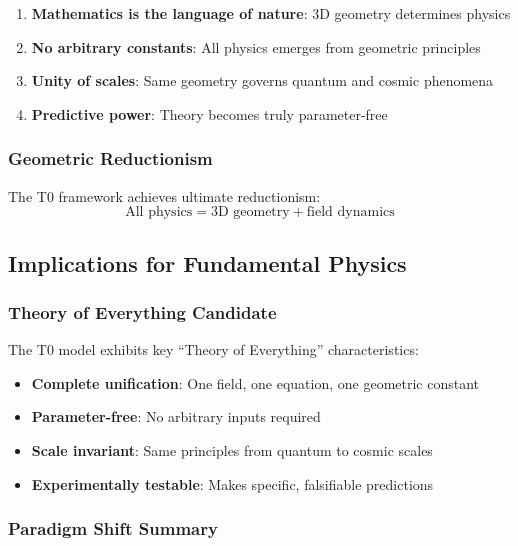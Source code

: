 \documentclass[12pt,a4paper]{article}
\begin{document}
	\begin{enumerate}
		\item \textbf{Mathematics is the language of nature}: 3D geometry determines physics
		\item \textbf{No arbitrary constants}: All physics emerges from geometric principles
		\item \textbf{Unity of scales}: Same geometry governs quantum and cosmic phenomena
		\item \textbf{Predictive power}: Theory becomes truly parameter-free
	\end{enumerate}
	
	\subsubsection{Geometric Reductionism}
	\label{subsubsec:geometric_reductionism}
	
	The T0 framework achieves ultimate reductionism:
	\begin{equation}
		\boxed{\text{All physics} = \text{3D geometry} + \text{field dynamics}}
		\label{eq:ultimate_reductionism}
	\end{equation}
	
	\subsection{Implications for Fundamental Physics}
	\label{subsec:fundamental_physics}
	
	\subsubsection{Theory of Everything Candidate}
	\label{subsubsec:toe_candidate}
	
	The T0 model exhibits key ``Theory of Everything'' characteristics:
	\begin{itemize}
		\item \textbf{Complete unification}: One field, one equation, one geometric constant
		\item \textbf{Parameter-free}: No arbitrary inputs required
		\item \textbf{Scale invariant}: Same principles from quantum to cosmic scales
		\item \textbf{Experimentally testable}: Makes specific, falsifiable predictions
	\end{itemize}
	
	\subsubsection{Paradigm Shift Summary}
	\label{subsubsec:paradigm_shift}
	
\end{document}
